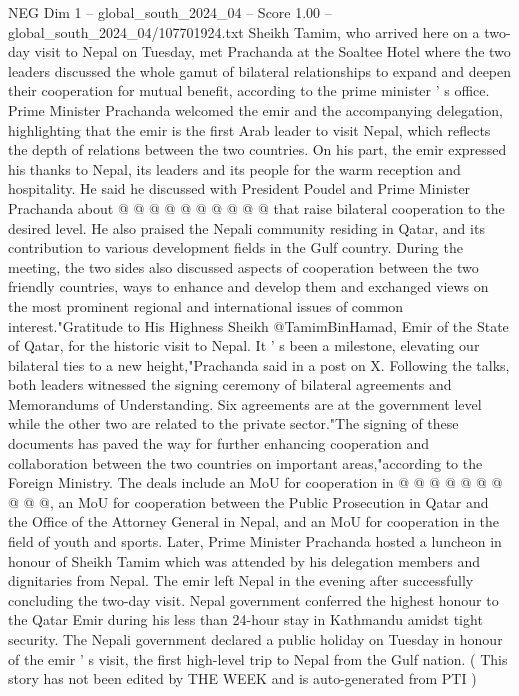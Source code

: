 \begin{textsample}{NEG Dim 1 – global\_south\_2024\_04 – Score 1.00 – global\_south\_2024\_04/107701924.txt}
Sheikh Tamim, who arrived here on a two-day visit to Nepal on Tuesday, met Prachanda at the Soaltee Hotel where the two leaders discussed the whole gamut of bilateral relationships to expand and deepen their cooperation for mutual benefit, according to the prime minister ' s office.
Prime Minister Prachanda welcomed the emir and the accompanying delegation, highlighting that the emir is the first Arab leader to visit Nepal, which reflects the depth of relations between the two countries.
On his part, the emir expressed his thanks to Nepal, its leaders and its people for the warm reception and hospitality.
He said he discussed with President Poudel and Prime Minister Prachanda about @ @ @ @ @ @ @ @ @ @ that raise bilateral cooperation to the desired level.
He also praised the Nepali community residing in Qatar, and its contribution to various development fields in the Gulf country.
During the meeting, the two sides also discussed aspects of cooperation between the two friendly countries, ways to enhance and develop them and exchanged views on the most prominent regional and international issues of common interest."Gratitude to His Highness Sheikh @TamimBinHamad, Emir of the State of Qatar, for the historic visit to Nepal.
It ' s been a milestone, elevating our bilateral ties to a new height,"Prachanda said in a post on X.
Following the talks, both leaders witnessed the signing ceremony of bilateral agreements and Memorandums of Understanding.
Six agreements are at the government level while the other two are related to the private sector."The signing of these documents has paved the way for further enhancing cooperation and collaboration between the two countries on important areas,"according to the Foreign Ministry.
The deals include an MoU for cooperation in @ @ @ @ @ @ @ @ @ @, an MoU for cooperation between the Public Prosecution in Qatar and the Office of the Attorney General in Nepal, and an MoU for cooperation in the field of youth and sports.
Later, Prime Minister Prachanda hosted a luncheon in honour of Sheikh Tamim which was attended by his delegation members and dignitaries from Nepal.
The emir left Nepal in the evening after successfully concluding the two-day visit.
Nepal government conferred the highest honour to the Qatar Emir during his less than 24-hour stay in Kathmandu amidst tight security.
The Nepali government declared a public holiday on Tuesday in honour of the emir ' s visit, the first high-level trip to Nepal from the Gulf nation. ( This story has not been edited by THE WEEK and is auto-generated from PTI )

\end{textsample}
